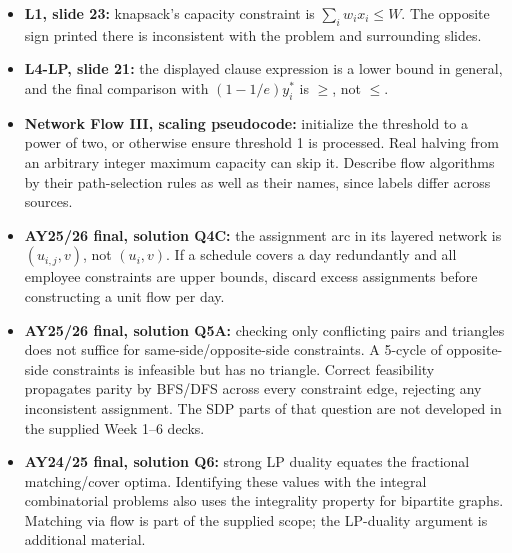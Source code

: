 \begin{itemize}
\item \textbf{L1, slide 23:} knapsack's capacity constraint is $\sum_i w_ix_i\le W$.
The opposite sign printed there is inconsistent with the problem and surrounding slides.
\item \textbf{L4-LP, slide 21:} the displayed clause expression is a lower bound in
general, and the final comparison with $(1-1/e)y_i^*$ is $\ge$, not $\le$.
\item \textbf{Network Flow III, scaling pseudocode:} initialize the threshold to a power
of two, or otherwise ensure threshold 1 is processed. Real halving from an arbitrary
integer maximum capacity can skip it. Describe flow algorithms by their path-selection
rules as well as their names, since labels differ across sources.
\item \textbf{AY25/26 final, solution Q4C:} the assignment arc in its layered network
is $(u_{i,j},v)$, not $(u_i,v)$. If a schedule covers a day redundantly and all employee
constraints are upper bounds, discard excess assignments before constructing a unit
flow per day.
\item \textbf{AY25/26 final, solution Q5A:} checking only conflicting pairs and triangles
does not suffice for same-side/opposite-side constraints. A 5-cycle of opposite-side
constraints is infeasible but has no triangle. Correct feasibility propagates parity by
BFS/DFS across every constraint edge, rejecting any inconsistent assignment. The SDP
parts of that question are not developed in the supplied Week 1--6 decks.
\item \textbf{AY24/25 final, solution Q6:} strong LP duality equates the fractional
matching/cover optima. Identifying these values with the integral combinatorial problems
also uses the integrality property for bipartite graphs. Matching via flow is part of the
supplied scope; the LP-duality argument is additional material.
\end{itemize}

